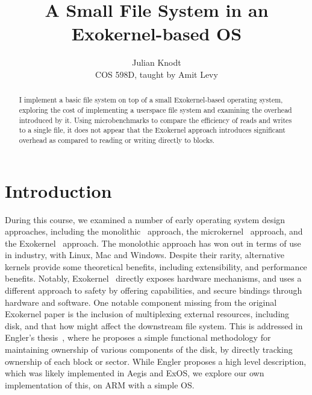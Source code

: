 \documentclass[letterpaper,twocolumn,10pt]{article}
\begin{document}

\title{A Small File System in an Exokernel-based OS}

\author{
  {\rm Julian Knodt} \\
  {\rm COS 598D, taught by Amit Levy}
}

\date{}
\maketitle

\begin{abstract}
I implement a basic file system on top of a small Exokernel-based operating system,
exploring the cost of implementing a userspace file system and examining
the overhead introduced by it. Using microbenchmarks to compare the efficiency of reads and
writes to a single file, it does not appear that the Exokernel approach introduces significant
overhead as compared to reading or writing directly to blocks.
\end{abstract}
\vspace{-12pt}
\section{Introduction}
During this course, we examined a number of early operating system design approaches, including
the monolithic~\cite{unix} approach, the microkernel~\cite{microkernel} approach, and the
Exokernel~\cite{exokernel} approach. The monolothic approach has won out in terms of use in
industry, with Linux, Mac and Windows. Despite their rarity, alternative kernels provide some
theoretical benefits, including extensibility, and performance benefits. Notably,
Exokernel~\cite{exokernel} directly exposes hardware mechanisms, and uses a different approach
to safety by offering capabilities, and secure bindings through hardware and software. One
notable component missing from the original Exokernel paper is the inclusion of multiplexing
external resources, including disk, and that how might affect the downstream file system. This
is addressed in Engler's thesis~\cite{proto_exo}, where he proposes a simple functional
methodology for maintaining ownership of various components of the disk, by directly tracking
ownership of each block or sector.  While Engler proposes a high level description, which was
likely implemented in Aegis and ExOS, we explore our own implementation of this, on ARM with a
simple OS.
\end{document}

